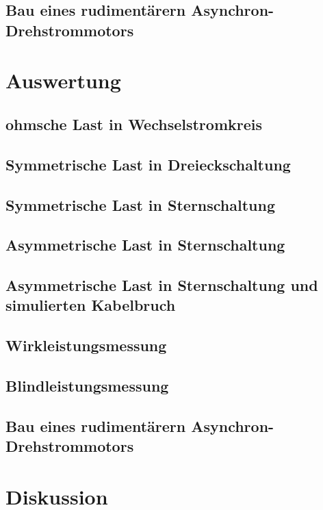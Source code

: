 \documentclass[12pt,english,ngerman]{scrartcl}
\begin{document}
\subsection{Bau eines rudimentärern Asynchron-Drehstrommotors}


\section{Auswertung}
\label{sec:auswertung}

\subsection{ohmsche Last in Wechselstromkreis}


\subsection{Symmetrische Last in Dreieckschaltung}


\subsection{Symmetrische Last in Sternschaltung}


\subsection{Asymmetrische Last in Sternschaltung}


\subsection{Asymmetrische Last in Sternschaltung und simulierten Kabelbruch}


\subsection{Wirkleistungsmessung}


\subsection{Blindleistungsmessung}


\subsection{Bau eines rudimentärern Asynchron-Drehstrommotors}


\section{Diskussion}
\label{sec:diskussion}
\end{document}
